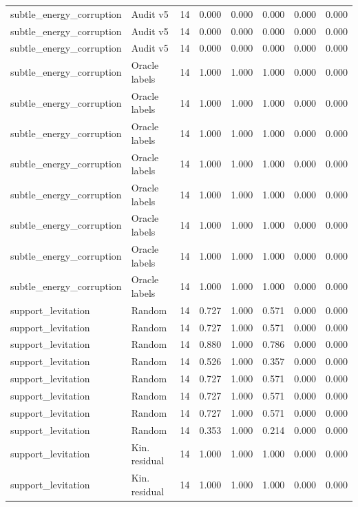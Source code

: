 {\begin{longtable}{llrrrrrr}
subtle\_energy\_corruption & Audit v5 & 14 & 0.000 & 0.000 & 0.000 & 0.000 & 0.000 \\
subtle\_energy\_corruption & Audit v5 & 14 & 0.000 & 0.000 & 0.000 & 0.000 & 0.000 \\
subtle\_energy\_corruption & Audit v5 & 14 & 0.000 & 0.000 & 0.000 & 0.000 & 0.000 \\
subtle\_energy\_corruption & Oracle labels & 14 & 1.000 & 1.000 & 1.000 & 0.000 & 0.000 \\
subtle\_energy\_corruption & Oracle labels & 14 & 1.000 & 1.000 & 1.000 & 0.000 & 0.000 \\
subtle\_energy\_corruption & Oracle labels & 14 & 1.000 & 1.000 & 1.000 & 0.000 & 0.000 \\
subtle\_energy\_corruption & Oracle labels & 14 & 1.000 & 1.000 & 1.000 & 0.000 & 0.000 \\
subtle\_energy\_corruption & Oracle labels & 14 & 1.000 & 1.000 & 1.000 & 0.000 & 0.000 \\
subtle\_energy\_corruption & Oracle labels & 14 & 1.000 & 1.000 & 1.000 & 0.000 & 0.000 \\
subtle\_energy\_corruption & Oracle labels & 14 & 1.000 & 1.000 & 1.000 & 0.000 & 0.000 \\
subtle\_energy\_corruption & Oracle labels & 14 & 1.000 & 1.000 & 1.000 & 0.000 & 0.000 \\
support\_levitation & Random & 14 & 0.727 & 1.000 & 0.571 & 0.000 & 0.000 \\
support\_levitation & Random & 14 & 0.727 & 1.000 & 0.571 & 0.000 & 0.000 \\
support\_levitation & Random & 14 & 0.880 & 1.000 & 0.786 & 0.000 & 0.000 \\
support\_levitation & Random & 14 & 0.526 & 1.000 & 0.357 & 0.000 & 0.000 \\
support\_levitation & Random & 14 & 0.727 & 1.000 & 0.571 & 0.000 & 0.000 \\
support\_levitation & Random & 14 & 0.727 & 1.000 & 0.571 & 0.000 & 0.000 \\
support\_levitation & Random & 14 & 0.727 & 1.000 & 0.571 & 0.000 & 0.000 \\
support\_levitation & Random & 14 & 0.353 & 1.000 & 0.214 & 0.000 & 0.000 \\
support\_levitation & Kin. residual & 14 & 1.000 & 1.000 & 1.000 & 0.000 & 0.000 \\
support\_levitation & Kin. residual & 14 & 1.000 & 1.000 & 1.000 & 0.000 & 0.000 \\

\end{longtable}}
